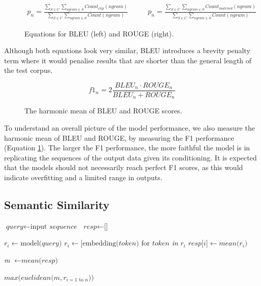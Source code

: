 \documentclass[12pt,twoside]{report}
\begin{document}
\begin{figure}[!ht]
	\begin{equation}
		\begin{split}
			p_n = \frac
			{\sum_{S\in C} \sum_{ngram\in S} Count_{clip}(ngram)}
			{\sum_{S\in C} \sum_{ngram\in S} Count(ngram)}
		\end{split}
		\quad\quad
		\begin{split}
			p_n = \frac
			{\sum_{S\in C} \sum_{ngram\in S} Count_{matched}(ngram)}
			{\sum_{S\in C} \sum_{ngram\in S} Count(ngram)}
		\end{split}
	\end{equation}
	\caption{Equations for BLEU (left) and ROUGE (right).}
	\end{figure}

Although both equations look very similar, BLEU introduces a brevity penalty term where it would penalise results that are shorter than the general length of the test corpus.

\begin{figure}[!ht]
	\begin{equation}
		f1_{n} = 2 \frac{BLEU_n \cdot ROUGE_n}{BLEU_n + ROUGE_n}
	\end{equation}
	\caption{The harmonic mean of BLEU and ROUGE scores.}
	\label{f1}
\end{figure}

To understand an overall picture of the model performance, we also measure the harmonic mean of BLEU and ROUGE, by measuring the F1 performance (Equation \ref{f1}). The larger the F1 performance, the more faithful the model is in replicating the sequences of the output data given its conditioning. It is expected that the models should not necessarily reach perfect F1 scores, as this would indicate overfitting and a limited range in outputs.

\subsection{Semantic Similarity}

\begin{algorithm}[!ht]
	\begin{algorithmic}[1]

	\State $\textit{query} \gets \text{input }\textit{sequence}$
	\State $\textit{resp} \gets \text{[]}$
	

		\State $r_i \gets \text{model(}\textit{query}\text{)}$
		\State $r_i \gets \text{[}\text{embedding}\text{(} token \text{) for } token $\emph{ in }$r_i$\text{]}
		\State $\textit{resp}\text{[}\textit{i}\text{]} \gets \textit{mean}\text{(}r_i\text{)}$
	\EndFor 

	\State \emph{m} $\gets \textit{mean} \text{(} \textit{resp} \text{)}$

	\State \Return $\textit{max}\text{(}\textit{euclidean}\text{(}m, r_{i=1 \text{ to } n}\text{))}$
	\EndProcedure
	\end{algorithmic}
	\end{algorithm}
\end{document}
